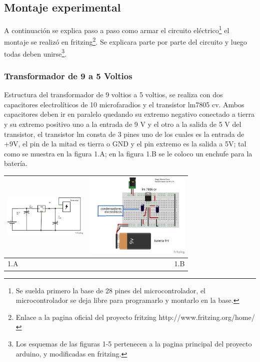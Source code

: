 \documentclass[12]{article}
\newenvironment{Figure}
{\par\medskip\noindent\minipage{\linewidth}}
{\endminipage\par\medskip}
\begin{document}
\begin{multicols}{2}
\subsection{Montaje experimental}

A continuación se explica paso a paso como armar el circuito eléctrico\footnote{Se suelda primero la base de 28 pines del microcontrolador, el microcontrolador se deja libre para programarlo y montarlo en la base.} el montaje se realizó en fritzing\footnote{Enlace a la pagina oficial del proyecto fritzing http://www.fritzing.org/home/}. Se explicara parte por parte del circuito y luego todas deben unirse\footnote{Los esquemas de las figuras  1-5 pertenecen a la pagina principal del proyecto arduino\cite{ARDUINO}, y modificadas en fritzing\cite{FRITZING}.}.


\subsubsection{Transformador de 9 a 5 Voltios}
Estructura del transformador de 9 voltios a 5 voltios, se realiza con dos capacitores electrolíticos de 10 microfaradios  y el transistor lm7805\cite{REGULADOR} cv. Ambos  capacitores deben ir en paralelo quedando su extremo negativo conectado a tierra y su extremo positivo uno a la entrada de 9 V y el otro a la salida de 5 V del transistor, el transistor lm consta de 3 pines uno de los cuales es la entrada de +9V, el pin de la mitad es tierra o GND y el pin extremo es la salida a 5V; tal como se muestra en la figura 1.A; en la figura 1.B se le coloco un enchufe para la batería. 
\begin{Figure}
\center
\begin{tabular}{|l|r|}
\hline
\includegraphics[width=4cm, height=4cm]{img/esquematrans.png}  & \includegraphics[width=4.cm, height=4cm]{img/montajetr5V.png} \\ \hline
1.A & 1.B \\ \hline
\end{tabular}
\label{fig:g1}
\end{Figure}


\end{multicols}
\end{document}
